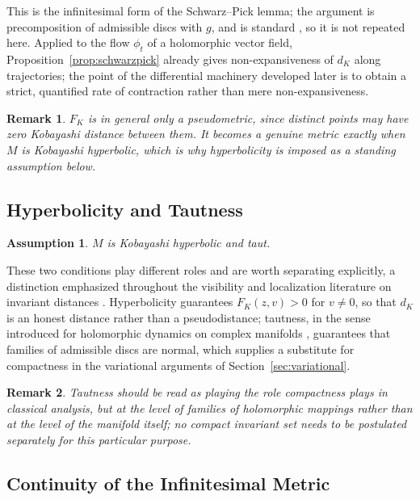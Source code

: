 \documentclass[preprint,12pt,authoryear]{elsarticle}
\newtheorem{remark}{Remark}
\newtheorem{assumption}{Assumption}
\begin{document}
This is the infinitesimal form of the Schwarz--Pick lemma; the argument is precomposition of admissible discs with $g$, and is standard \cite{ahlfors1979complex,kobayashi1998hyperbolic}, so it is not repeated here. Applied to the flow $\phi_t$ of a holomorphic vector field, Proposition~\ref{prop:schwarzpick} already gives non-expansiveness of $d_K$ along trajectories; the point of the differential machinery developed later is to obtain a strict, quantified rate of contraction rather than mere non-expansiveness.

\begin{remark}
$F_K$ is in general only a pseudometric, since distinct points may have zero Kobayashi distance between them. It becomes a genuine metric exactly when $M$ is Kobayashi hyperbolic, which is why hyperbolicity is imposed as a standing assumption below.
\end{remark}

\subsection{Hyperbolicity and Tautness}

\begin{assumption}
\label{ass:hyptaut}
$M$ is Kobayashi hyperbolic and taut.
\end{assumption}

These two conditions play different roles and are worth separating explicitly, a distinction emphasized throughout the visibility and localization literature on invariant distances \cite{sarkarad2023localization,nikolov2023visibility,bharali2023unbounded}. Hyperbolicity guarantees $F_K(z,v)>0$ for $v\ne0$, so that $d_K$ is an honest distance rather than a pseudodistance; tautness, in the sense introduced for holomorphic dynamics on complex manifolds \cite{abate1989iteration}, guarantees that families of admissible discs are normal, which supplies a substitute for compactness in the variational arguments of Section~\ref{sec:variational}.

\begin{remark}
Tautness should be read as playing the role compactness plays in classical analysis, but at the level of families of holomorphic mappings rather than at the level of the manifold itself; no compact invariant set needs to be postulated separately for this particular purpose.
\end{remark}

\subsection{Continuity of the Infinitesimal Metric}
\label{subsec:continuity}
\end{document}
